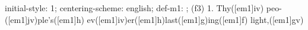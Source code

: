 initial-style: 1;
centering-scheme: english;
def-m1: \grealign;
(f3) 1. Thy([em1]iv) peo-([em1]jv)ple's([em1]h) ev([em1]iv)er([em1]h)last([em1]g)ing([em1]f) light,([em1]gv)